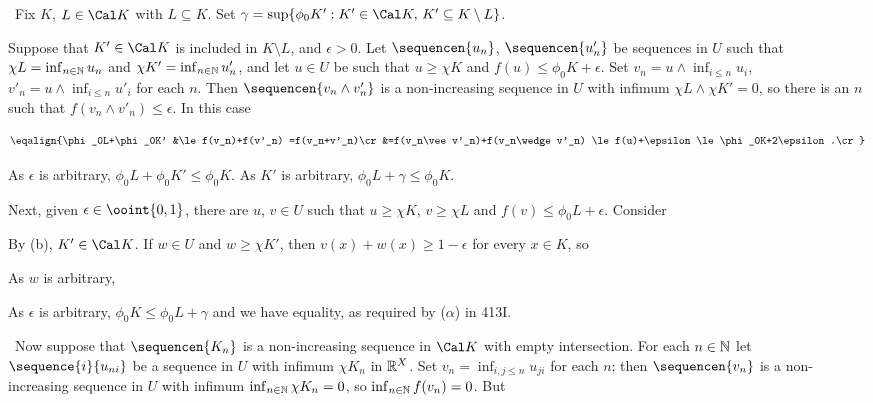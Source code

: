 {\medskip 
      
\quad\grheada\ Fix $K$, $L\in\Cal K$ with $L\subseteq K$.   Set 
$\gamma=\sup\{\phi_0K':K'\in\Cal K,\,K'\subseteq K\setminus L\}$. 
      
\medskip 
      
 Suppose that $K'\in\Cal K$ is included in $K\setminus L$,  
and $\epsilon>0$.   Let $\sequencen{u_n}$, $\sequencen{u'_n}$ be 
sequences in $U$ such that $\chi L=\inf_{n\in\Bbb N}u_n$ and  
$\chi K'=\inf_{n\in\Bbb N}u'_n$, and let $u\in U$ be such that $u\ge\chi K$ 
and $f(u)\le\phi_0K+\epsilon$.   Set $v_n=u\wedge\inf_{i\le n}u_i$, 
$v'_n=u\wedge\inf_{i\le n}u'_i$ for each $n$.   Then 
$\sequencen{v_n\wedge v'_n}$ is a non-increasing sequence in $U$ with  
infimum $\chi L\wedge\chi K'=0$, so there is an $n$ such that  
$f(v_n\wedge v'_n)\le\epsilon$.   In this case 
      
$$\eqalign{\phi_0L+\phi_0K' 
&\le f(v_n)+f(v'_n) 
=f(v_n+v'_n)\cr 
&=f(v_n\vee v'_n)+f(v_n\wedge v'_n) 
\le f(u)+\epsilon 
\le\phi_0K+2\epsilon.\cr}$$ 
      
\noindent As $\epsilon$ is arbitrary, $\phi_0L+\phi_0K'\le \phi_0K$. 
As $K'$ is arbitrary, $\phi_0L+\gamma\le\phi_0K$. 
      
\medskip 
      
 Next, given $\epsilon\in\ooint{0,1}$, there are $u$, 
$v\in U$ such that $u\ge\chi K$, $v\ge\chi L$ and 
$f(v)\le\phi_0L+\epsilon$.   Consider 
      
      
\noindent By (b), $K'\in\Cal K$.   If $w\in U$ and 
$w\ge\chi K'$, then $v(x)+w(x)\ge 1-\epsilon$ for every $x\in K$, so 
      
      
\noindent As $w$ is arbitrary, 
      
      
\noindent As $\epsilon$ is arbitrary, $\phi_0K\le\phi_0L+\gamma$ and we 
have equality, as required by ($\alpha$) in 413I. 
      
\medskip 
      
\quad\grheadb\ Now suppose that $\sequencen{K_n}$ is a non-increasing 
sequence in $\Cal K$ with empty intersection.   For each $n\in\Bbb N$ 
let $\sequence{i}{u_{ni}}$ be a sequence in $U$ with infimum $\chi K_n$ 
in $\Bbb R^X$.   Set $v_n=\inf_{i,j\le n}u_{ji}$ for each $n$;  then 
$\sequencen{v_n}$ is a non-increasing sequence in $U$ with infimum 
$\inf_{n\in\Bbb N}\chi K_n=0$, so $\inf_{n\in\Bbb N}f(v_n)=0$.   But 
      
}
